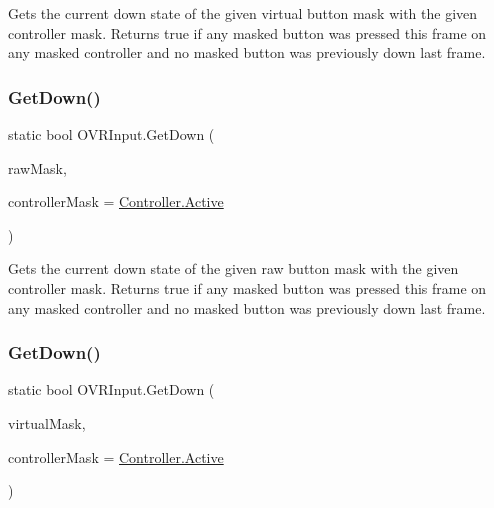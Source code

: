 Gets the current down state of the given virtual button mask with the given controller mask. Returns true if any masked button was pressed this frame on any masked controller and no masked button was previously down last frame. 

\mbox{\label{class_o_v_r_input_aa1f47bbdab31082c5173cb8905b720d5}} 
\subsubsection{\texorpdfstring{Get\+Down()}{GetDown()}\hspace{0.1cm}{\footnotesize\ttfamily [2/6]}}
{\footnotesize\ttfamily static bool O\+V\+R\+Input.\+Get\+Down (\begin{DoxyParamCaption}\item[{\mbox{\hyperlink{class_o_v_r_input_a9d6423af820e22b93f0b33a4fc4bf77a}{Raw\+Button}}}]{raw\+Mask,  }\item[{\mbox{\hyperlink{class_o_v_r_input_a5c86f9052a9cbb0b73779ff5704d60a8}{Controller}}}]{controller\+Mask = {\ttfamily \mbox{\hyperlink{class_o_v_r_input_a5c86f9052a9cbb0b73779ff5704d60a8a4d3d769b812b6faa6b76e1a8abaece2d}{Controller.\+Active}}} }\end{DoxyParamCaption})\hspace{0.3cm}{\ttfamily [static]}}



Gets the current down state of the given raw button mask with the given controller mask. Returns true if any masked button was pressed this frame on any masked controller and no masked button was previously down last frame. 

\mbox{\label{class_o_v_r_input_a2ac7a06a7df7f7e3371d7183d144dea9}} 
\subsubsection{\texorpdfstring{Get\+Down()}{GetDown()}\hspace{0.1cm}{\footnotesize\ttfamily [3/6]}}
{\footnotesize\ttfamily static bool O\+V\+R\+Input.\+Get\+Down (\begin{DoxyParamCaption}\item[{\mbox{\hyperlink{class_o_v_r_input_a4e1f1eb856223383aefc1965dd2db39a}{Touch}}}]{virtual\+Mask,  }\item[{\mbox{\hyperlink{class_o_v_r_input_a5c86f9052a9cbb0b73779ff5704d60a8}{Controller}}}]{controller\+Mask = {\ttfamily \mbox{\hyperlink{class_o_v_r_input_a5c86f9052a9cbb0b73779ff5704d60a8a4d3d769b812b6faa6b76e1a8abaece2d}{Controller.\+Active}}} }\end{DoxyParamCaption})\hspace{0.3cm}{\ttfamily [static]}}



